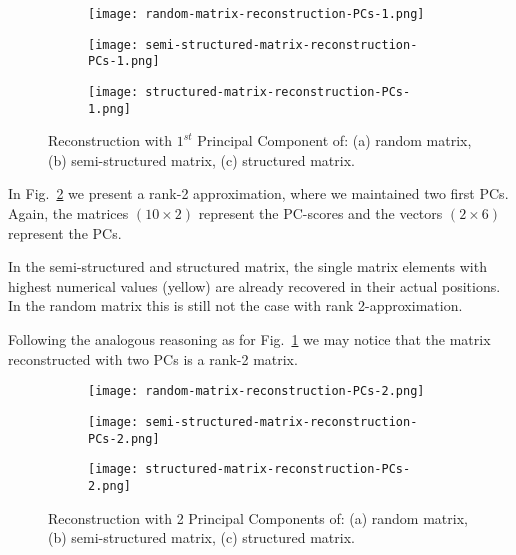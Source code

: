 \documentclass[10pt,twocolumn]{article}
\begin{document}
\begin{figure}[H]
\begin{subfigure}[t]{.15\textwidth}
\centering
\texttt{[image: random-matrix-reconstruction-PCs-1.png]}
\caption{ }
\end{subfigure}
\begin{subfigure}[t]{.15\textwidth}
\centering
\texttt{[image: semi-structured-matrix-reconstruction-PCs-1.png]}
\caption{ }
\end{subfigure}
\begin{subfigure}[t]{.15\textwidth}
\centering
\texttt{[image: structured-matrix-reconstruction-PCs-1.png]}
\caption{ }
\end{subfigure}
\caption{Reconstruction with $1^{st}$ Principal Component of: (a) random matrix, (b) semi-structured matrix, (c) structured matrix.}
\label{fig:matrices-reconstruction-1}
\end{figure}

In Fig.~\ref{fig:matrices-reconstruction-2} we present a rank-2 approximation, where we maintained two first PCs. Again, the matrices $(10 \times 2)$ represent the PC-scores and the vectors $(2 \times 6)$ represent the PCs.

In the semi-structured and structured matrix, the single matrix elements with highest numerical values (yellow) are already recovered in their actual positions. In the random matrix this is still not the case with rank 2-approximation.

Following the analogous reasoning as for Fig.~\ref{fig:matrices-reconstruction-1} we may notice that the matrix reconstructed with two PCs is a rank-2 matrix.


\begin{figure}[H]
\begin{subfigure}[t]{.15\textwidth}
\centering
\texttt{[image: random-matrix-reconstruction-PCs-2.png]}
\caption{ }
\end{subfigure}
\begin{subfigure}[t]{.15\textwidth}
\centering
\texttt{[image: semi-structured-matrix-reconstruction-PCs-2.png]}
\caption{ }
\end{subfigure}
\begin{subfigure}[t]{.15\textwidth}
\centering
\texttt{[image: structured-matrix-reconstruction-PCs-2.png]}
\caption{ }
\end{subfigure}
\caption{Reconstruction with 2 Principal Components of: (a) random matrix, (b) semi-structured matrix, (c) structured matrix.}
\label{fig:matrices-reconstruction-2}
\end{figure}
\end{document}
